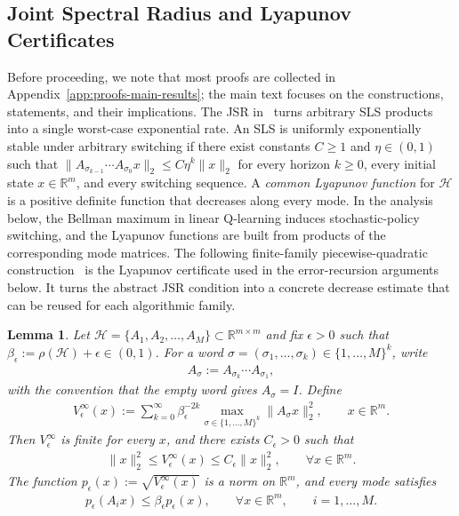 \documentclass[letterpaper]{article}
\numberwithin{equation}{section}
\newtheorem{lemma}{Lemma}[section]
\newcommand{\R}{\mathbb{R}}
\begin{document}
\subsection{Joint Spectral Radius and Lyapunov Certificates}
\label{sec:joint_spectral_radius}
Before proceeding, we note that most proofs are collected in Appendix~\ref{app:proofs-main-results}; the main text focuses on the constructions, statements, and their implications.
The JSR in~ turns arbitrary SLS products into a
single worst-case exponential rate. An SLS is uniformly exponentially stable under arbitrary switching if there
exist constants $C\geq1$
and $\eta\in(0,1)$ such that $\|A_{\sigma_{k-1}}\cdots A_{\sigma_0}x\|_2\leq C\eta^k\|x\|_2$ for every horizon $k\geq0$, every initial state $x\in\R^m$, and every switching
sequence. A \emph{common Lyapunov function} for $\mathcal H$ is a positive definite
function that decreases along every mode. In the analysis below, the Bellman
maximum in linear Q-learning induces stochastic-policy switching, and the
Lyapunov functions are built from products of the corresponding mode matrices.
The following finite-family piecewise-quadratic construction~\citep{lee2026lyapunovcertified,hushenzhang2010generating} is the Lyapunov certificate used in the error-recursion arguments below.
It turns the abstract JSR condition into a concrete decrease estimate that can be
reused for each algorithmic family.
\begin{lemma}
\label{lem:common_lyapunov_construction}
Let $\mathcal H=\{A_1,A_2,\ldots,A_M\}\subset\R^{m\times m}$ and fix
$\epsilon>0$ such that $\beta_\epsilon:=\rho(\mathcal H)+\epsilon\in(0,1)$.
For a word $\sigma=(\sigma_1,\ldots,\sigma_k)\in\{1,\ldots,M\}^k$, write
\begin{align*}
A_\sigma:=A_{\sigma_k}\cdots A_{\sigma_1},
\end{align*}
with the convention that the empty word gives $A_\sigma=I$. Define
\begin{align*}
V_\epsilon^\infty(x)
:=\sum_{k=0}^\infty \beta_\epsilon^{-2k}
\max_{\sigma\in\{1,\ldots,M\}^k}\|A_\sigma x\|_2^2,
\qquad x\in\R^m.
\end{align*}
Then $V_\epsilon^\infty$ is finite for every $x$, and there exists
$C_\epsilon>0$ such that
\begin{align*}
\|x\|_2^2\leq V_\epsilon^\infty(x)\leq C_\epsilon\|x\|_2^2,
\qquad \forall x\in\R^m.
\end{align*}
The function $p_\epsilon(x):=\sqrt{V_\epsilon^\infty(x)}$ is a norm on
$\R^m$, and every mode satisfies
\begin{align*}
p_\epsilon(A_i x)\leq\beta_\epsilon p_\epsilon(x),
\qquad \forall x\in\R^m,
\qquad i=1,\ldots,M.
\end{align*}
\end{lemma}
\end{document}
